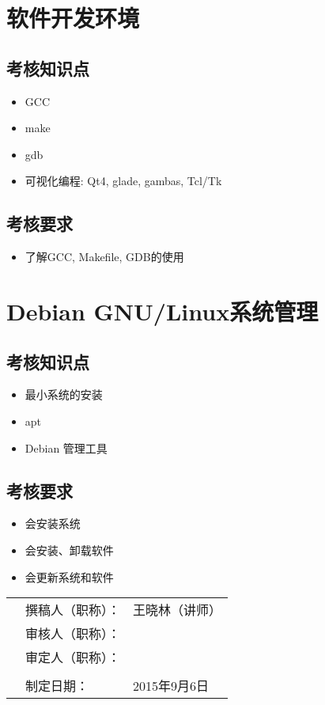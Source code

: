 \documentclass[12pt,a4paper]{article}
\begin{document}
\section{软件开发环境}

\subsection{考核知识点}

\begin{itemize}
\item GCC
\item make
\item gdb
\item 可视化编程: Qt4, glade, gambas, Tcl/Tk
\end{itemize}

\subsection{考核要求}

\begin{itemize}
\item 了解GCC, Makefile, GDB的使用
\end{itemize}

\section{Debian GNU/Linux系统管理}

\subsection{考核知识点}

\begin{itemize}
\item 最小系统的安装
\item apt
\item Debian 管理工具
\end{itemize}

\subsection{考核要求}

\begin{itemize}
\item 会安装系统
\item 会安装、卸载软件
\item 会更新系统和软件
\end{itemize}

\vspace{10em}
\begin{table}[h]
  \begin{tabular}{p{20em}ll}
    &撰稿人（职称）：&王晓林（讲师）\\
    &审核人（职称）：&\\
    &审定人（职称）：&\\
    &&\\
    &制定日期：&2015年9月6日\\
  \end{tabular}
\end{table}
\end{document}
